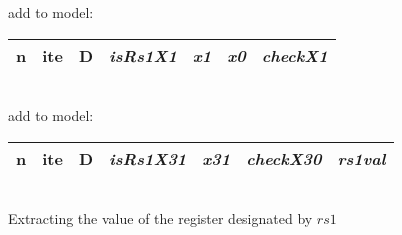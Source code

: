 \begin{algorithm}
    add to model:\\
    \begin{tabular}[h]{>{\ttfamily\color{UniRed}}r >{\ttfamily}l >{\ttfamily\color{UniGrey}}l >{\slshape\color{UniRed}}l >{\slshape\color{UniRed}}l >{\slshape\color{UniRed}}l >{\slshape} l}
        \hline
        \hline
        n & ite & D & isRs1X1 & x1 & x0 & checkX1 \\
        \hline
        \hline
    \end{tabular}\\
    \BlankLine
    add to model:\\
    \begin{tabular}[h]{>{\ttfamily\color{UniRed}}r >{\ttfamily}l >{\ttfamily\color{UniGrey}}l >{\slshape\color{UniRed}}l >{\slshape\color{UniRed}}l >{\slshape\color{UniRed}}l >{\slshape} l}
        \hline
        \hline
        n & ite & D & isRs1X31 & x31 & checkX30 & rs1val \\
        \hline
        \hline
    \end{tabular}\\

    \caption[Value extraction from $rs1$]{Extracting the value of the register designated by $rs1$}
    \label{alg:extractrs1val}
\end{algorithm}